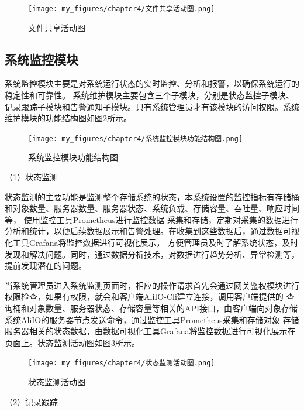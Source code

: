 \begin{figure}[h]
    \centering
    \texttt{[image: my\_figures/chapter4/文件共享活动图.png]}
    \caption{文件共享活动图}
    \label{fig:文件共享活动图}
\end{figure}


\subsection{系统监控模块}



系统监控模块主要是对系统运行状态的实时监控、分析和报警，以确保系统运行的稳定性和可靠性。
系统维护模块主要包含三个子模块，分别是状态监控子模块、
记录跟踪子模块和告警通知子模块。只有系统管理员才有该模块的访问权限。系统维护模块的功能结构图如图\ref{fig:系统监控模块功能结构图}所示。
\begin{figure}[h]
    \centering
    \texttt{[image: my\_figures/chapter4/系统监控模块功能结构图.png]}
    \caption{系统监控模块功能结构图}
    \label{fig:系统监控模块功能结构图}
\end{figure}


（1）状态监测

状态监测的主要功能是监测整个存储系统的状态，本系统设置的监控指标有存储桶和对象数量、服务器数量、服务器状态、系统负载、存储容量、吞吐量、响应时间等，
使用监控工具Prometheus进行监控数据
采集和存储，定期对采集的数据进行分析和统计，以便后续数据展示和告警处理。在收集到这些数据后，通过数据可视化工具Grafana将监控数据进行可视化展示，
方便管理员及时了解系统状态，及时发现和解决问题。同时，通过数据分析技术，对数据进行趋势分析、异常检测等，提前发现潜在的问题。

当系统管理员进入系统监测页面时，相应的操作请求首先会通过网关鉴权模块进行权限检查，如果有权限，就会和客户端AliIO-Cli建立连接，调用客户端提供的
查询桶和对象数量、服务器状态、存储容量等相关的API接口，由客户端向对象存储系统AliIO的服务器节点发送命令，通过监控工具Prometheus采集和存储对象
存储服务器相关的状态数据，由数据可视化工具Grafana将监控数据进行可视化展示在页面上。状态监测活动图如图\ref{fig:状态监测活动图}所示。

\begin{figure}[htb]
    \centering
    \texttt{[image: my\_figures/chapter4/状态监测活动图.png]}
    \caption{状态监测活动图}
    \label{fig:状态监测活动图}
\end{figure}

（2）记录跟踪

